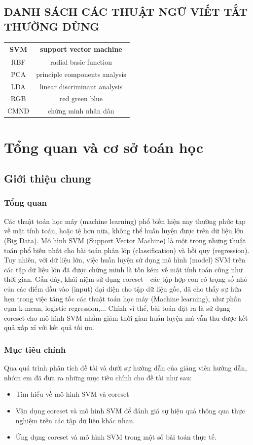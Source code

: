 \documentclass[a4paper, 12pt, oneside]{report}
\begin{document}
\begin{titlepage}
\section*{DANH SÁCH CÁC THUẬT NGỮ VIẾT TẮT THƯỜNG DÙNG} 
\bigskip
\bigskip
\begin{tabular}{|c|c|}
\hline 
SVM & support vector machine\\ 
\hline 
RBF & radial basic function\\
\hline
PCA & principle components analysis \\
\hline
LDA & linear discriminant analysis\\
\hline
RGB & red green blue\\
\hline
CMND & chứng minh nhân dân \\
\hline
\end{tabular}
\bigskip
 \end{titlepage}
\newpage
\tableofcontents
\newpage
\chapter{Tổng quan và cơ sở toán học}
\section{Giới thiệu chung}
\subsection{Tổng quan}
Các thuật toán học máy (machine learning) phổ biến hiện nay thường phức tạp về mặt tính toán, hoặc tệ hơn nữa, không thể huấn luyện  được trên dữ liệu lớn (Big Data). Mô hình SVM (Support Vector Machine) là một trong những thuật toán phổ biến nhất cho bài toán phân lớp (classification) và hồi quy (regression). Tuy nhiên, với dữ liệu lớn, việc huấn luyện sử dụng mô hình (model) SVM trên các tập dữ liệu lớn đã được chứng minh là tốn kém về mặt tính toán cũng như thời gian. Gần đây, khái niệm sử dụng coreset - các tập hợp con có trọng số nhỏ của các điểm đầu vào (input) đại diện cho tập dữ liệu gốc, đã cho thấy sự hứa hẹn trong việc tăng tốc các thuật toán học máy (Machine learning), như phân cụm k-mean, logistic regression,... Chính vì thế, bài toán đặt ra là sử dụng coreset cho mô hình SVM nhằm giảm thời gian huấn luyện mà vẫn thu được kết quả xấp xỉ với kết quả tối ưu.
\subsection{Mục tiêu chính}
Qua quá trình phân tích đề tài và dưới sự hướng dẫn của giảng viên hướng dẫn, nhóm em đã đưa ra những mục tiêu chính cho đề tài như sau:
\begin{itemize}
    \item 
    Tìm hiểu về mô hình SVM và coreset
    \item
    Vận dụng coreset và mô hình SVM để đánh giá sự hiệu quả thông qua thực nghiệm trên các tập dữ liệu khác nhau.
    \item
    Ứng dụng coreset và mô hình SVM trong một số bài toán thực tế.
\end{itemize}
\end{document}
